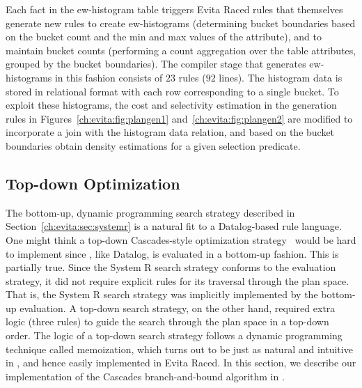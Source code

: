 Each fact in the ew-histogram table triggers Evita Raced rules that themselves generate
new rules to create ew-histograms (determining bucket boundaries based on the bucket
count and the min and max values of the attribute), and to maintain bucket counts (performing
a count aggregation over the table attributes, grouped by the bucket boundaries). The compiler
stage that generates ew-histograms in this fashion consists of $23$ rules ($92$ lines). The 
histogram data is stored in relational format with each row corresponding to a single bucket.
To exploit these histograms, the cost and selectivity estimation in the  generation rules
in Figures~\ref{ch:evita:fig:plangen1} and~\ref{ch:evita:fig:plangen2} are modified to incorporate
a join with the histogram data relation, and based on the bucket boundaries obtain density 
estimations for a given selection predicate.

\subsection{Top-down Optimization}
\label{ch:evita:sec:cascades}

The bottom-up, dynamic programming search strategy described in
Section~\ref{ch:evita:sec:systemr} is a natural fit to a Datalog-based rule
language.  One might think a top-down Cascades-style optimization
strategy~\cite{cascades} would be hard to implement since \OVERLOG, like
Datalog, is evaluated in a bottom-up fashion.  This is partially true.  Since
the System R search strategy conforms to the \OVERLOG evaluation strategy, it
did not require explicit rules for its traversal through the plan space.  That is,
the System R search strategy was implicitly implemented by the \OVERLOG
bottom-up evaluation.  A top-down search strategy, on the other hand, required
extra logic (three rules) to guide the search through the plan space in
a top-down order.  The logic of a top-down search strategy follows a dynamic
programming technique called memoization, which turns out to be just as natural
and intuitive in \OVERLOG, and hence easily implemented in Evita
Raced.  In this section, we describe our implementation of the Cascades
branch-and-bound algorithm in \OVERLOG.

